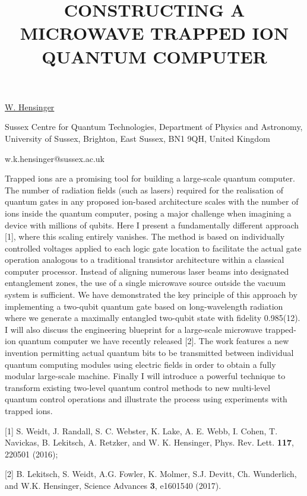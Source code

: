 \title{CONSTRUCTING A MICROWAVE TRAPPED ION QUANTUM COMPUTER}

\underline{W. Hensinger} 

{\normalsize{\vspace{-4mm}
Sussex Centre for Quantum Technologies,
Department of Physics and Astronomy, University of Sussex,
Brighton, East Sussex, BN1 9QH, United Kingdom

\email w.k.hensinger@sussex.ac.uk}}

Trapped ions are a promising tool for building a large-scale quantum computer. The number of radiation fields (such as lasers) required for the realisation of quantum gates in any proposed ion-based architecture scales with the number of ions inside the quantum computer, posing a major challenge when imagining a device with millions of qubits. Here I present a fundamentally different approach [1], where this scaling entirely vanishes. The method is based on individually controlled voltages applied to each logic gate location to facilitate the actual gate operation analogous to a traditional transistor architecture within a classical computer processor. Instead of aligning numerous laser beams into designated entanglement zones, the use of a single microwave source outside the vacuum system is sufficient. We have demonstrated the key principle of this approach by implementing a two-qubit quantum gate based on long-wavelength radiation where we generate a maximally entangled two-qubit state with fidelity 0.985(12). I will also discuss the engineering blueprint for a large-scale microwave trapped-ion quantum computer we have recently released [2]. The work features a new invention permitting actual quantum bits to be transmitted between individual quantum computing modules using electric fields in order to obtain a fully modular large-scale machine. Finally I will introduce a powerful technique to transform existing two-level quantum control methods to new multi-level quantum control operations and illustrate the process using experiments with trapped ions.

{\normalsize
[1] S. Weidt, J. Randall, S. C. Webster, K. Lake, A. E. Webb, I. Cohen, T. Navickas, B. Lekitsch, A. Retzker, and W. K. Hensinger, Phys. Rev. Lett. \textbf{117}, 220501 (2016);
\vsp

[2] B. Lekitsch, S. Weidt, A.G. Fowler, K. Molmer, S.J. Devitt, Ch. Wunderlich, and W.K. Hensinger, Science Advances \textbf{3}, e1601540 (2017).
}

\vspace{\baselineskip} 